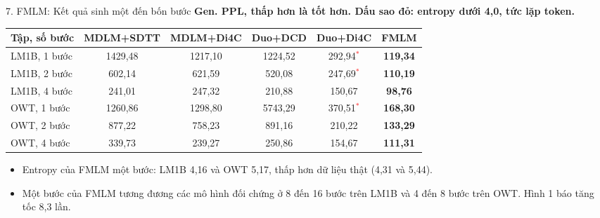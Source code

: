\begin{frame}{7. FMLM: Kết quả sinh một đến bốn bước}
    \small
    \textbf{Gen. PPL, thấp hơn là tốt hơn. Dấu sao đỏ: entropy dưới 4,0, tức lặp token.}
    \begin{table}[h]
        \centering
        \footnotesize
        \begin{tabular}{lccccc}
            \toprule
            \textbf{Tập, số bước} & \textbf{MDLM+SDTT} & \textbf{MDLM+Di4C} & \textbf{Duo+DCD} & \textbf{Duo+Di4C} & \textbf{FMLM} \\
            \midrule
            LM1B, 1 bước & 1429,48 & 1217,10 & 1224,52 & 292,94\textcolor{red}{$^*$} & \textbf{119,34} \\
            LM1B, 2 bước & 602,14 & 621,59 & 520,08 & 247,69\textcolor{red}{$^*$} & \textbf{110,19} \\
            LM1B, 4 bước & 241,01 & 247,32 & 210,88 & 150,67 & \textbf{98,76} \\
            \midrule
            OWT, 1 bước & 1260,86 & 1298,80 & 5743,29 & 370,51\textcolor{red}{$^*$} & \textbf{168,30} \\
            OWT, 2 bước & 877,22 & 758,23 & 891,16 & 210,22 & \textbf{133,29} \\
            OWT, 4 bước & 339,73 & 239,27 & 250,86 & 154,67 & \textbf{111,31} \\
            \bottomrule
        \end{tabular}
    \end{table}
    \vspace{-0.2cm}
    \begin{itemize}
        \item Entropy của FMLM một bước: LM1B 4,16 và OWT 5,17, thấp hơn dữ liệu thật (4,31 và 5,44).
        \item Một bước của FMLM tương đương các mô hình đối chứng ở 8 đến 16 bước trên LM1B và 4 đến 8 bước trên OWT. Hình 1 báo tăng tốc 8,3 lần.
    \end{itemize}
\end{frame}


